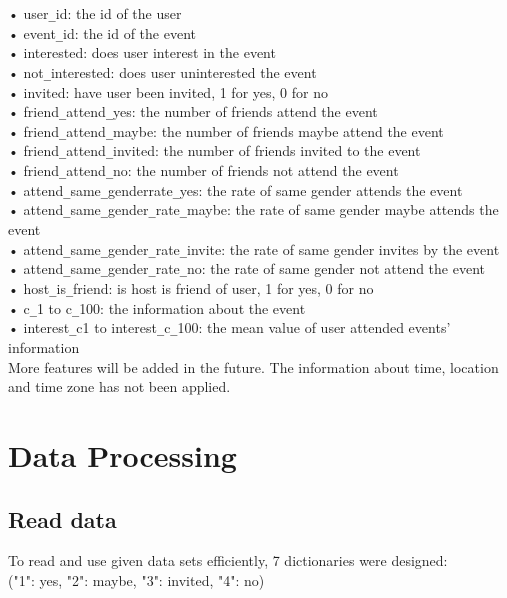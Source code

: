 \documentclass{article}
\begin{document}
•	user\verb+_+id: the id of the user\\
•	event\verb+_+id: the id of the event\\
•	interested: does user interest in the event\\
•	not\verb+_+interested: does user uninterested the event\\
•	invited: have user been invited, 1 for yes, 0 for no\\
•	friend\verb+_+attend\verb+_+yes: the number of friends attend the event\\
•	friend\verb+_+attend\verb+_+maybe: the number of friends maybe attend the event\\
•	friend\verb+_+attend\verb+_+invited: the number of friends invited to the event\\
•	friend\verb+_+attend\verb+_+no: the number of friends not attend the event\\
•	attend\verb+_+same\verb+_+genderrate\verb+_+yes: the rate of same gender attends the event\\
•	attend\verb+_+same\verb+_+gender\verb+_+rate\verb+_+maybe: the rate of same gender maybe attends the event\\
•	attend\verb+_+same\verb+_+gender\verb+_+rate\verb+_+invite: the rate of same gender invites by the event\\
•	attend\verb+_+same\verb+_+gender\verb+_+rate\verb+_+no: the rate of same gender not attend the event\\
•	host\verb+_+is\verb+_+friend: is host is friend of user, 1 for yes, 0 for no\\
•	c\verb+_+1 to c\verb+_+100: the information about the event\\
•	interest\verb+_+c1 to interest\verb+_+c\verb+_+100: the mean value of user attended events’ information\\

More features will be added in the future. The information about time, location and time zone has not been applied. 


\section{Data Processing}

\subsection{Read data}

To read and use given data sets efficiently, 7 dictionaries were designed:\\
("1": yes, "2": maybe, "3": invited, "4": no)
\end{document}
